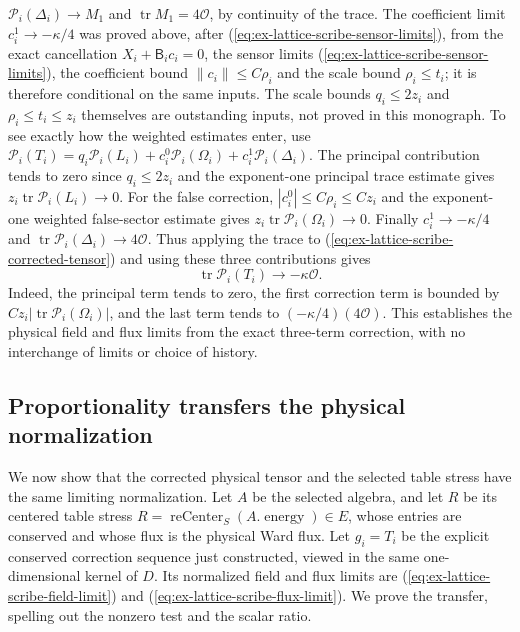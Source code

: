 $\mathcal P_i(\Delta_i)\to M_1$ and $\operatorname{tr}M_1=4\mathcal O$, by
continuity of the trace. The coefficient limit $c_i^1\to-\kappa/4$ was
proved above, after (\ref{eq:ex-lattice-scribe-sensor-limits}), from the
exact cancellation $X_i+\mathsf B_ic_i=0$, the sensor limits
(\ref{eq:ex-lattice-scribe-sensor-limits}), the coefficient bound
$\|c_i\|\le C\rho_i$ and the scale bound $\rho_i\le t_i$; it is therefore
conditional on the same inputs. The scale bounds $q_i\le2z_i$ and
$\rho_i\le t_i\le z_i$ themselves are outstanding inputs, not proved in
this monograph.
To see exactly how the weighted estimates enter, use
$\mathcal P_i(T_i)=q_i\mathcal P_i(L_i)
+c_i^0\mathcal P_i(\Omega_i)
+c_i^1\mathcal P_i(\Delta_i)$. The principal contribution tends
to zero since $q_i\le2z_i$ and the exponent-one principal trace estimate
gives $z_i\operatorname{tr}\mathcal P_i(L_i)\to0$. For the false
correction, $|c_i^0|\le C\rho_i\le Cz_i$ and the exponent-one
weighted false-sector estimate gives
$z_i\operatorname{tr}\mathcal P_i(\Omega_i)\to0$.
Finally $c_i^1\to-\kappa/4$ and
$\operatorname{tr}\mathcal P_i(\Delta_i)\to4\mathcal O$.
Thus applying the trace to (\ref{eq:ex-lattice-scribe-corrected-tensor})
and using these three contributions gives
\begin{equation}
 \operatorname{tr}\mathcal P_i(T_i)\longrightarrow-\kappa\mathcal O.
 \label{eq:ex-lattice-scribe-flux-limit}
\end{equation}
Indeed, the principal term tends to zero, the first correction term is
bounded by $C z_i|\operatorname{tr}\mathcal P_i(\Omega_i)|$, and the last
term tends to $(-\kappa/4)(4\mathcal O)$. This establishes the physical
field and flux limits from the exact three-term correction, with no
interchange of limits or choice of history.

\subsection{Proportionality transfers the physical normalization}

We now show that the corrected physical tensor and the selected table
stress have the same limiting normalization. Let $A$ be the selected
algebra, and let $R$ be its centered table stress
$R=\operatorname{reCenter}_S(A.\operatorname{energy})\in E$, whose entries
are conserved and whose flux is the physical Ward flux. Let $g_i=T_i$ be
the explicit conserved correction sequence just constructed, viewed in the
same one-dimensional kernel of $D$. Its normalized field
and flux limits are (\ref{eq:ex-lattice-scribe-field-limit}) and
(\ref{eq:ex-lattice-scribe-flux-limit}). We prove the transfer, spelling
out the nonzero test and the scalar ratio.

